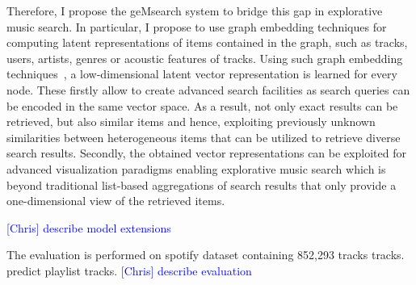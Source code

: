 \documentclass[sigconf]{acmart}
\newcommand{\ce}[1]{\textcolor{blue}{[Chris] #1}}
\newcommand{\ce}[1]{}
\begin{document}
Therefore, I propose the geMsearch system to bridge this gap in explorative music search. In particular, I propose to use graph embedding techniques for computing latent representations of items contained in the graph, such as tracks, users, artists, genres or acoustic features of tracks. Using such graph embedding techniques~\cite{yan2007graph}, a low-dimensional latent vector representation is learned for every node. These firstly allow to create advanced search facilities as search queries can be encoded in the same vector space. As a result, not only exact results can be retrieved, but also similar items and hence, exploiting previously unknown similarities between heterogeneous items that can be utilized to retrieve diverse search results. Secondly, the obtained vector representations can be exploited for advanced visualization paradigms enabling explorative music search which is beyond traditional list-based aggregations of search results that only provide a one-dimensional view of the retrieved items. 



\ce{describe model extensions}


The evaluation is performed on spotify dataset containing 852,293 tracks tracks. predict playlist tracks.
\ce{describe evaluation} \\

\end{document}
